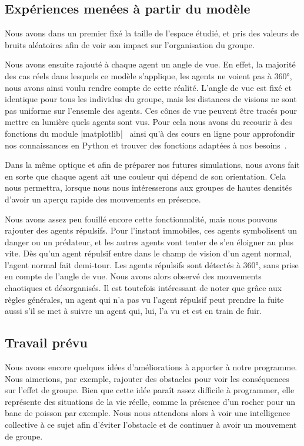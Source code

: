 \documentclass[french, a4paper, 12pt]{article}
\begin{document}
	\subsection{Expériences menées à partir du modèle}
	Nous avons dans un premier fixé la taille de l'espace étudié, et pris des valeurs de bruits aléatoires afin de voir son impact sur l'organisation du groupe.

	Nous avons ensuite rajouté à chaque agent un angle de vue. En effet, la majorité des cas réels dans lesquels ce modèle s'applique, les agents ne voient pas à 360°, nous avons ainsi voulu rendre compte de cette réalité. L'angle de vue est fixé et identique pour tous les individus du groupe, mais les distances de visions ne sont pas uniforme sur l'ensemle des agents. Ces cônes de vue peuvent être tracés pour mettre en lumière quels agents sont vus. Pour cela nous avons du recourir à des fonctions du module \python|matplotlib|~\cite{matplotlib} ainsi qu'à des cours en ligne pour approfondir nos connaissances en Python et trouver des fonctions adaptées à nos besoins~\cite{python}.

	Dans la même optique et afin de préparer nos futures simulations, nous avons fait en sorte que chaque agent ait une couleur qui dépend de son orientation. Cela nous permettra, lorsque nous nous intéresserons aux groupes de hautes densités d'avoir un aperçu rapide des mouvements en présence.
    
	Nous avons assez peu fouillé encore cette fonctionnalité, mais nous pouvons rajouter des agents répulsifs. Pour l'instant immobiles, ces agents symbolisent un danger ou un prédateur, et les autres agents vont tenter de s'en éloigner au plus vite. Dès qu'un agent répulsif entre dans le champ de vision d'un agent normal, l'agent normal fait demi-tour. Les agents répulsifs sont détectés à 360°, sans prise en compte de l'angle de vue. Nous avons alors observé des mouvements chaotiques et désorganisés. Il est toutefois intéressant de noter que grâce aux règles générales, un agent qui n'a pas vu l'agent répulsif peut prendre la fuite aussi s'il se met à suivre un agent qui, lui, l'a vu et est en train de fuir.

	\subsection{Travail prévu}
	Nous avons encore quelques idées d'améliorations à apporter à notre programme. Nous aimerions, par exemple, rajouter des obstacles pour voir les conséquences sur l'effet de groupe. Bien que cette idée paraît assez difficile à programmer, elle représente des situations de la vie réelle, comme la présence d'un rocher pour un banc de poisson par exemple. Nous nous attendons alors à voir une intelligence collective à ce sujet afin d'éviter l'obstacle et de continuer à avoir un mouvement de groupe.
	
\end{document}

